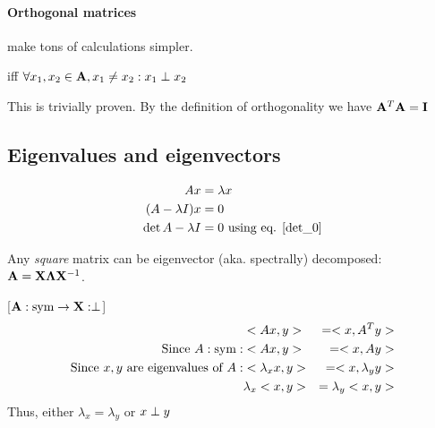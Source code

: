 \paragraph{Orthogonal matrices} make tons of calculations simpler.
\begin{definition} iff $\forall x_1, x_2 \in \mathbf{A}, x_1 \neq x_2: x_1 \perp x_2$
\end{definition}

\begin{theorem}
    [If $A$ is orthogonal, than $A^{-1} = A^T$.]
    This is trivially proven. By the definition of orthogonality we have $\mathbf{A}^T \mathbf{A} = \mathbf{I}$
\end{theorem}








\subsection{Eigenvalues and eigenvectors}

\begin{equation}
    \begin{aligned}
        A x &= \lambda x \\
        ( A - \lambda I ) x &= 0 \\
        \det{A - \lambda I} &= 0 \text{ using eq. \ref{det_0}}
    \end{aligned}
\end{equation}

Any \emph{square} matrix can be eigenvector (aka. spectrally) decomposed: $\mathbf{A} = \mathbf{X} \mathbf{\Lambda}\mathbf{X}^{-1}$.

\begin{theorem} \label{symm_then_orth}
    [$\mathbf{A}: \text{sym} \to \mathbf{X}: \perp$]
    \begin{equation}
        \begin{aligned}
                                                                & <Ax, y> &= <x, A^Ty> \\
            \text{Since } A:\text{sym}:                              & <Ax, y> &= <x, Ay> \\
            \text{Since } x, y \text{ are eigenvalues of } A:   & <\lambda_x x, y> &= <x, \lambda_y y> \\
                                                                & \lambda_x <x, y> &= \lambda_y <x, y>
        \end{aligned}
    \end{equation}
    Thus, either $\lambda_x = \lambda_y$ or $x \perp y$ 
\end{theorem}

